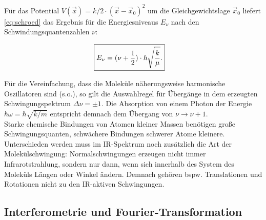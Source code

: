 \documentclass[a4paper,10pt,twocolumn]{article}
\newcommand{\ix}[1]{_\text{#1}}
\begin{document}
		F\"ur das Potential $V(\vec{x})=k/2\cdot (\vec{x}-\vec{x}\ix{0})^{2}$ um die Gleichgewichtslage $\vec{x}\ix{0}$ liefert \autoref{eq:schroed} das Ergebnis f\"ur die Energiesniveaus $E_{\nu}$ nach den Schwindungsquantenzahlen $\nu$:
	
			\begin{align}
				\Aboxed{E_{\nu}=(\nu+\frac{1}{2})\cdot\hbar\sqrt{\frac{k}{\mu}}.
				}
			\end{align}
	
		F\"ur die Vereinfachung, dass die Molek\"ule n\"aherungsweise harmonische Oszillatoren sind (s.o.), so gilt die Auswahlregel f\"ur \"Uberg\"ange in dem erzeugten Schwingungspektrum $\Delta\nu=\pm1$. Die Absorption von einem Photon der Energie $\hbar\omega=\hbar\sqrt{k/m}$ entspricht demnach dem \"Ubergang von $\nu\rightarrow\nu+1$.\\
		Starke chemische Bindungen von Atomen kleiner Massen ben\"otigen gro{\ss}e Schwingungsquanten, schw\"achere Bindungen schwerer Atome kleinere.\\
		Unterschieden werden muss im IR-Spektrum noch zus\"atzlich die Art der Molek\"ulschwingung: Normalschwingungen erzeugen nicht immer Infrarotstrahlung, sondern nur dann, wenn sich innerhalb des System des Molek\"uls L\"angen oder Winkel \"andern. Demnach geh\"oren bspw. Translationen und Rotationen nicht zu den IR-aktiven Schwingungen.
	
	\subsection{Interferometrie und Fourier-Transformation}
	
\end{document}
